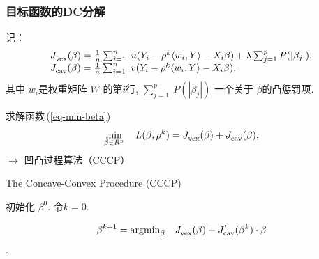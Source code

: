 \documentclass{beamer}
\begin{document}
\begin{frame}

 \frametitle{目标函数的DC分解}

记：
  \begin{equation}\label{EQ_J_cav_J_vex}
\begin{array}{l}
J_{\textnormal{vex}}^{}(\beta)=  \frac{1}{n}\sum_{i=1}^n\ u(Y_i - \rho^k \langle w_i,Y\rangle - X_i\beta) + \lambda\sum_{j=1}^p P(|\beta_j|), \\
J_{\textnormal{cav}}^{}(\beta) = \frac{1}{n}\sum_{i=1}^n\ v(Y_i - \rho^k \langle w_i,Y\rangle - X_i\beta)  , \\
\end{array}
\end{equation}
 其中 %
  $w_i$是权重矩阵 $W$ 的第$i$行,
  $\sum_{j=1}^p\ P(|\beta_j|)$ 一个关于 $\beta$的凸惩罚项.


求解函数\,(\ref{eq-min-beta})%
\begin{equation*}
  \min_{\beta\in R^p}^{} \quad  L(\beta,\rho^k) =
    J_{\textnormal{vex}}^{}(\beta) + J_{\textnormal{cav}}^{}(\beta),
\end{equation*}
$\longrightarrow$ 凹凸过程算法（CCCP） %


\end{frame}


\begin{frame}%

\begin{algorithm}[H]

\caption{The    Concave-Convex Procedure (CCCP)  } \label{Alg_general_CCCP}



\begin{algorithmic}[1]



\STATE     初始化 $\beta_{}^{0}$. 令$k=0$.

\REPEAT
\STATE     \begin{equation}\label{EQ_ite_CCCP}
        \beta_{}^{k+1} = \textnormal{argmin}_{\beta}^{} \quad J_{\textnormal{vex}}^{}(\beta) + J_{\textnormal{cav}}^{\prime}(\beta^k)\cdot \beta
     \end{equation}
.

 \end{algorithmic}
\end{algorithm}


\end{frame}
\end{document}
